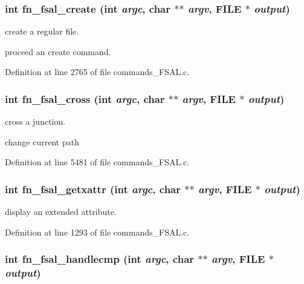 \subsubsection[{fn\_\-fsal\_\-create}]{\setlength{\rightskip}{0pt plus 5cm}int fn\_\-fsal\_\-create (int {\em argc}, \/  char $\ast$$\ast$ {\em argv}, \/  FILE $\ast$ {\em output})}\label{commands_8h_3bce309b30ce91cedd92062521d09b4d}


create a regular file.

proceed an create command. 

Definition at line 2765 of file commands\_\-FSAL.c.
\subsubsection[{fn\_\-fsal\_\-cross}]{\setlength{\rightskip}{0pt plus 5cm}int fn\_\-fsal\_\-cross (int {\em argc}, \/  char $\ast$$\ast$ {\em argv}, \/  FILE $\ast$ {\em output})}\label{commands_8h_87895e361f769c6c2e3679db5be9ad81}


cross a junction.

change current path 

Definition at line 5481 of file commands\_\-FSAL.c.
\subsubsection[{fn\_\-fsal\_\-getxattr}]{\setlength{\rightskip}{0pt plus 5cm}int fn\_\-fsal\_\-getxattr (int {\em argc}, \/  char $\ast$$\ast$ {\em argv}, \/  FILE $\ast$ {\em output})}\label{commands_8h_1bc9d8bedd2c8b5adb767b449879ee18}


display an extended attribute. 

Definition at line 1293 of file commands\_\-FSAL.c.
\subsubsection[{fn\_\-fsal\_\-handlecmp}]{\setlength{\rightskip}{0pt plus 5cm}int fn\_\-fsal\_\-handlecmp (int {\em argc}, \/  char $\ast$$\ast$ {\em argv}, \/  FILE $\ast$ {\em output})}\label{commands_8h_c09a903f6e71134eb73920e6bc873b63}


